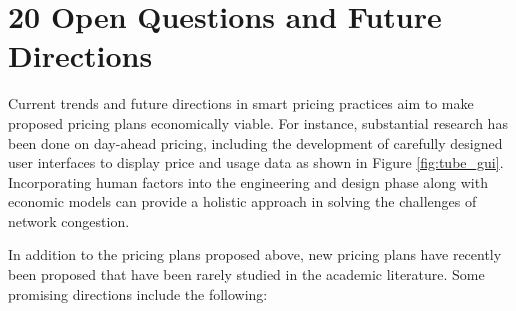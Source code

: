 \section{20 Open Questions and Future Directions}\label{sec:20Q}

Current trends and future directions in smart pricing practices aim to make proposed pricing plans economically viable. For instance, substantial research has been done on day-ahead pricing, including the development of carefully designed user interfaces to display price and usage data as shown in Figure \ref{fig:tube_gui}. Incorporating human factors into the engineering and design phase along with economic models can provide a holistic approach in solving the challenges of network congestion.

In addition to the pricing plans proposed above, new pricing plans have recently been proposed that have been rarely studied in the academic literature. Some promising directions include the following:


